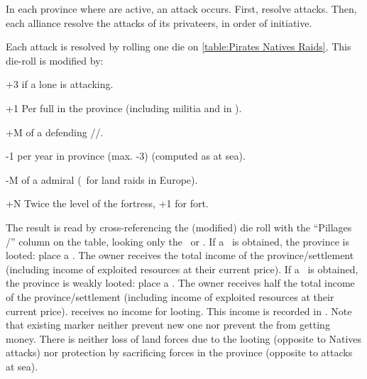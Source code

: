  In each province where
\corsaire are active, an attack occurs.
\bparag First, resolve  \corsaire attacks.
\bparag Then, each alliance resolve the attacks of its privateers, in order of
initiative.

\bparag Each attack is resolved by rolling one die on \ref{table:Pirates
  Natives Raids}. This die-roll is modified by:
\begin{modlist}
\item[+3] if a lone \corsaire\facemoins is attacking.
\item[+1] Per full \LD in the province (including militia and \LD in \ARMY).
\item[+M] \Man of a defending \LeaderG/\LeaderC/\LeaderGov.
\item[-1] per year in province (max. -3) (computed as at
  sea). %
\item[-M] \Man of a \corsaire admiral (\textonehalf\ for land raids in
  Europe).
\item[+N] Twice the level of the fortress, +1 for fort.
\end{modlist}

\bparag The result is read by cross-referencing the (modified) die roll with
the ``Pillages \TP/\COL'' column on the table, looking only the \textdag\ or
\textddag.
\bparag If a \textddag\ is obtained, the province is looted: place a
\PILLAGE\faceplus. The \corsaire owner receives the total income of the
province/settlement (including income of exploited resources at their current
price).
\bparag If a \textdag\ is obtained, the province is weakly looted: place a
\PILLAGE\facemoins. The \corsaire owner receives half the total income of
the province/settlement (including income of exploited resources at their
current price).
\bparag {} receives no income for looting.
\bparag This income is recorded in .
\bparag Note that existing \PILLAGE marker neither prevent new one nor prevent
the \corsaire from getting money.
\bparag There is neither loss of land forces due to the looting (opposite to
Natives attacks) nor protection by sacrificing forces in the province
(opposite to attacks at sea).

